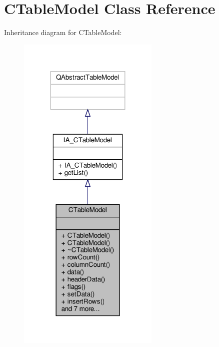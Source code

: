 \hypertarget{classCTableModel}{}\section{C\+Table\+Model Class Reference}
\label{classCTableModel}


Inheritance diagram for C\+Table\+Model\+:
\nopagebreak
\begin{figure}[H]
\begin{center}
\leavevmode
\includegraphics[width=191pt]{classCTableModel__inherit__graph}
\end{center}
\end{figure}


